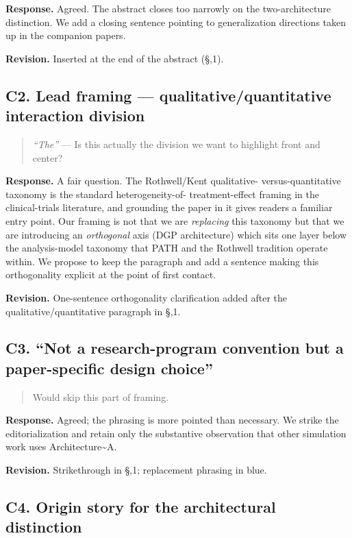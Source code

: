\documentclass[
]{article}
\begin{document}
\textbf{Response.} Agreed. The abstract closes too narrowly on the
two-architecture distinction. We add a closing sentence pointing to
generalization directions taken up in the companion papers.

\textbf{Revision.} Inserted at the end of the abstract (\S,1).

\subsection*{C2. Lead framing --- qualitative/quantitative
interaction division}

\begin{quote}
\textit{``The''} --- Is this actually the division we want to
highlight front and center?
\end{quote}

\textbf{Response.} A fair question. The Rothwell/Kent qualitative-
versus-quantitative taxonomy is the standard heterogeneity-of-
treatment-effect framing in the clinical-trials literature, and
grounding the paper in it gives readers a familiar entry point. Our
framing is not that we are \textit{replacing} this taxonomy but
that we are introducing an \textit{orthogonal} axis (DGP
architecture) which sits one layer below the analysis-model
taxonomy that PATH and the Rothwell tradition operate within. We
propose to keep the paragraph and add a sentence making this
orthogonality explicit at the point of first contact.

\textbf{Revision.} One-sentence orthogonality clarification added
after the qualitative/quantitative paragraph in \S,1.

\subsection*{C3. ``Not a research-program convention but a
paper-specific design choice''}

\begin{quote}
Would skip this part of framing.
\end{quote}

\textbf{Response.} Agreed; the phrasing is more pointed than
necessary. We strike the editorialization and retain only the
substantive observation that other simulation work uses
Architecture\textasciitilde A.

\textbf{Revision.} Strikethrough in \S,1; replacement phrasing in
blue.

\subsection*{C4. Origin story for the architectural distinction}
\end{document}

